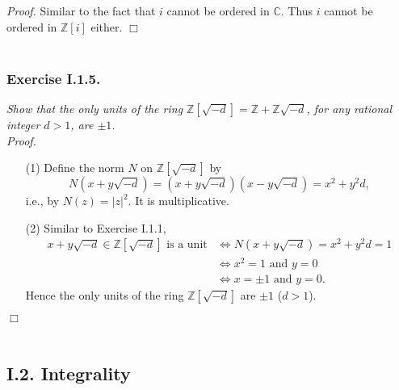 \documentclass{article}
\begin{document}
\emph{Proof.}
  Similar to the fact that $i$ cannot be ordered in $\mathbb{C}$.
  Thus $i$ cannot be ordered in $\mathbb{Z}[i]$ either.
$\Box$ \\\\






\subsubsection*{Exercise I.1.5.}
\emph{Show that the only units of the ring $\mathbb{Z}[\sqrt{-d}] = \mathbb{Z} + \mathbb{Z}\sqrt{-d}$,
for any rational integer $d > 1$, are $\pm 1$.} \\



\emph{Proof.}
\begin{enumerate}
\item[(1)]
  Define the norm $N$ on $\mathbb{Z}[\sqrt{-d}]$ by
  \[
    N(x+y\sqrt{-d}) = (x+y\sqrt{-d})(x-y\sqrt{-d}) = x^2 + y^2 d,
  \]
  i.e., by $N(z) = |z|^2$.
  It is multiplicative.

\item[(2)]
  Similar to Exercise I.1.1,
  \begin{align*}
    \text{$x+y\sqrt{-d} \in \mathbb{Z}[\sqrt{-d}]$ is a unit}
    &\Longleftrightarrow
    N(x+y\sqrt{-d}) = x^2 + y^2 d = 1 \\
    &\Longleftrightarrow
    x^2 = 1 \text{ and } y = 0 \\
    &\Longleftrightarrow
    x = \pm 1 \text{ and } y = 0.
  \end{align*}
  Hence the only units of the ring $\mathbb{Z}[\sqrt{-d}]$ are $\pm 1$ ($d > 1$).
\end{enumerate}
$\Box$ \\\\






\subsection*{I.2. Integrality \\}
\end{document}
